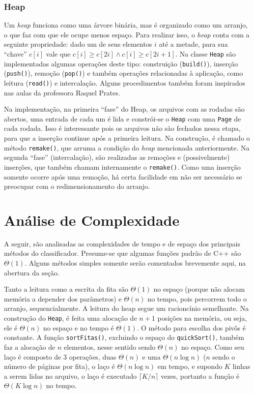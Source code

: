 \documentclass{article}
\def\code#1{\texttt{#1}}
\begin{document}
\subsubsection{Heap}

Um \textit{heap} funciona como uma árvore binária, mas é organizado como um arranjo, o que faz com que ele ocupe menos espaço. Para realizar isso, o \textit{heap} conta com a seguinte propriedade: dado um de seus elementos \( i \) até a metade, para sua ``chave'' \( c[i] \) vale que \( c[i] \geq c[2i] \land c[i] \geq c[2i+1] \). Na classe \code{Heap} são implementadas algumas operações deste tipo: construição (\code{build()}), inserção (\code{push()}), remoção (\code{pop()}) e também operações relacionadas à aplicação, como leitura (\code{read()}) e intercalação. Alguns procedimentos também foram inspirados nas aulas da professora Raquel Prates.

Na implementação, na primeira ``fase'' do Heap, os arquivos com as rodadas são abertos, uma entrada de cada um é lida e constrói-se o \code{Heap} com uma \code{Page} de cada rodada. Isso é interessante pois os arquivos não são fechados nessa etapa, para que a inserção continue após a primeira leitura. Na construção, é chamado o método \code{remake()}, que arruma a condição do \textit{heap} mencionada anteriormente. Na segunda ``fase'' (intercalação), são realizadas as remoções e (possivelmente) inserções, que também chamam internamente o \code{remake()}. Como uma inserção somente ocorre após uma remoção, há certa facilidade em não ser necessário se preocupar com o redimensionamento do arranjo.

\section{Análise de Complexidade}

A seguir, são analisadas as complexidades de tempo e de espaço dos principais métodos do classificador. Presume-se que algumas funções padrão de C++ são \( \Theta(1) \). Alguns métodos simples somente serão comentados brevemente aqui, na abertura da seção.

Tanto a leitura como a escrita da fita são \( \Theta(1) \) no espaço (porque não alocam memória a depender dos parâmetros) e \( \Theta(n) \) no tempo, pois percorrem todo o arranjo, sequencialmente. A leitura do heap segue um racioncínio semelhante. Na construção do \code{Heap}, é feita uma alocação de  \( n + 1 \) posições na memória, ou seja, ele é \( \Theta(n) \) no espaço e no tempo é \( \Theta(1) \). O método para escolha dos pivôs é constante. A função \code{sortFitas()}, excluindo o espaço do \code{quickSort()}, também faz a alocação de \( n \) elementos, nesse sentido sendo \( \Theta(n) \) no espaço. Como seu laço é composto de 3 operações, duas \( \Theta(n) \) e uma \( \Theta(n \log n) \) (\( n \) sendo o número de páginas por fita), o laço é \( \Theta(n \log n) \) em tempo, e supondo \( K \) linhas a serem lidas no arquivo, o laço é executado \( \lceil K/n \rceil \) vezes, portanto a função é \( \Theta(K\log n) \) no tempo.
\end{document}
